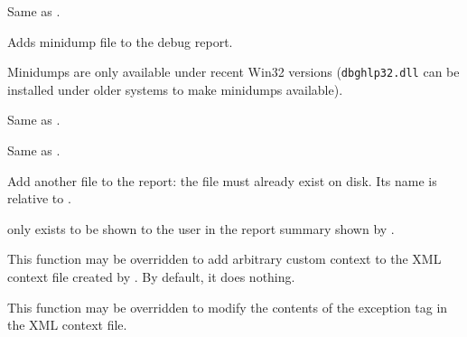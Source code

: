 Same as .


\label{wxdebugreportadddump}


Adds minidump file to the debug report.

Minidumps are only available under recent Win32 versions (\texttt{dbghlp32.dll}
can be installed under older systems to make minidumps available).


\label{wxdebugreportaddexceptioncontext}


Same as .


\label{wxdebugreportaddexceptiondump}


Same as .


\label{wxdebugreportaddfile}


Add another file to the report: the file must already exist on disk. Its name
is relative to .

 only exists to be shown to the user in the report summary
shown by .


\label{wxdebugreportdoaddcustomcontext}


This function may be overridden to add arbitrary custom context to the XML
context file created by . By
default, it does nothing.


\label{wxdebugreportdoaddexceptioninfo}


This function may be overridden to modify the contents of the exception tag in
the XML context file.


